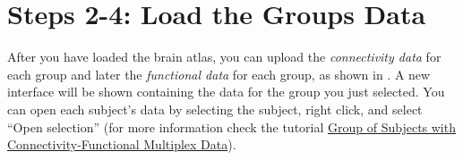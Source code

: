 \documentclass[justified]{tufte-handout}
\begin{document}

\clearpage

\section{Steps 2-4: Load the Groups Data}

After you have loaded the brain atlas, you can upload the \emph{connectivity data} for each group and later the \emph{functional data} for each group, as shown in . A new interface will be shown containing the data for the group you just selected. You can open each subject’s data by selecting the subject, right click, and select “Open selection” (for more information check the tutorial \href{https://github.com/braph-software/BRAPH-2/tree/develop/tutorials/data/tut_gr_con_fun_mp}{Group of Subjects with Connectivity-Functional Multiplex Data}).
\end{document}
